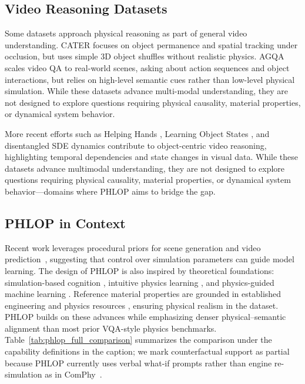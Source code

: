 \documentclass[conference]{IEEEtran}
\begin{document}
\subsection{Video Reasoning Datasets}
Some datasets approach physical reasoning as part of general video understanding. CATER \cite{girdhar2019cater} focuses on object permanence and spatial tracking under occlusion, but uses simple 3D object shuffles without realistic physics. AGQA \cite{grunde2021agqa} scales video QA to real-world scenes, asking about action sequences and object interactions, but relies on high-level semantic cues rather than low-level physical simulation. While these datasets advance multi-modal understanding, they are not designed to explore questions requiring physical causality, material properties, or dynamical system behavior.




More recent efforts such as Helping Hands \cite{helpinghands2023}, Learning Object States \cite{learningObjectStates2023}, and disentangled SDE dynamics \cite{disentangleSDE2023} contribute to object-centric video reasoning, highlighting temporal dependencies and state changes in visual data. 
While these datasets advance multimodal understanding, they are not designed to explore questions requiring physical causality, material properties, or dynamical system behavior—domains where PHLOP aims to bridge the gap.


\subsection{PHLOP in Context}


Recent work leverages procedural priors for scene generation and video prediction~\cite{takenaka2023procedural}, suggesting that control over simulation parameters can guide model learning. 
The design of PHLOP is also inspired by theoretical foundations: simulation-based cognition \cite{battaglia2013simulation}, intuitive physics learning \cite{piloto2022intuitive}, and physics-guided machine learning \cite{physicsguided2023}. Reference material properties are grounded in established engineering and physics resources \cite{ashby2018engineering,callister2020materials,halliday2013physics}, ensuring physical realism in the dataset.  
PHLOP builds on these advances while emphasizing denser physical--semantic alignment than most prior VQA-style physics benchmarks. Table~\ref{tab:phlop_full_comparison} summarizes the comparison under the capability definitions in the caption; we mark counterfactual support as partial because PHLOP currently uses verbal what-if prompts rather than engine re-simulation as in ComPhy~\cite{chen2022comphy}.
\end{document}
